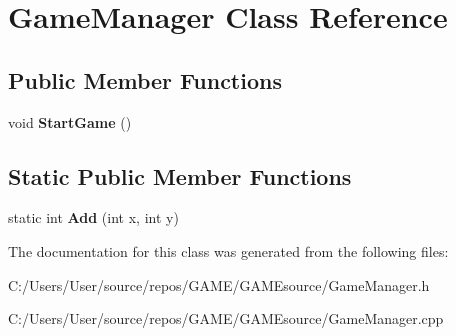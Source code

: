 \hypertarget{class_game_manager}{}\section{Game\+Manager Class Reference}
\label{class_game_manager}
\subsection*{Public Member Functions}
\begin{DoxyCompactItemize}
\item 
\mbox{\label{class_game_manager_a3af49a72977052275a1217c5018c737f}} 
void {\bfseries Start\+Game} ()
\end{DoxyCompactItemize}
\subsection*{Static Public Member Functions}
\begin{DoxyCompactItemize}
\item 
\mbox{\label{class_game_manager_acf7198ccac2dde4da381867356136896}} 
static int {\bfseries Add} (int x, int y)
\end{DoxyCompactItemize}


The documentation for this class was generated from the following files\+:\begin{DoxyCompactItemize}
\item 
C\+:/\+Users/\+User/source/repos/\+G\+A\+M\+E/\+G\+A\+M\+Esource/Game\+Manager.\+h\item 
C\+:/\+Users/\+User/source/repos/\+G\+A\+M\+E/\+G\+A\+M\+Esource/Game\+Manager.\+cpp\end{DoxyCompactItemize}
